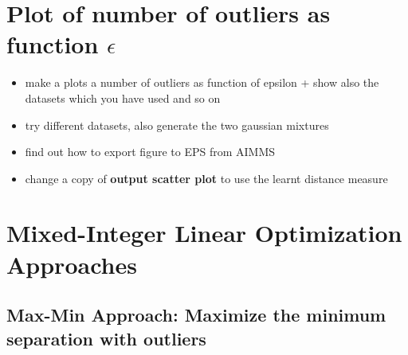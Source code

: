 \documentclass[]{article}
\begin{document}
 

\section{Plot of number of outliers as function $\epsilon$}


\begin{itemize}
\item 
  make a plots a number of outliers as function of epsilon
+ show also the datasets which you have used and so on
\item 
  try different datasets, also generate the two gaussian mixtures
\item   find out how to export figure to EPS from AIMMS
\item  change a copy of {\bf output scatter plot} to use the learnt distance measure
\end{itemize}














\newpage
\section{Mixed-Integer Linear Optimization Approaches}

\subsection{Max-Min Approach: Maximize the minimum separation with outliers}
\end{document}
